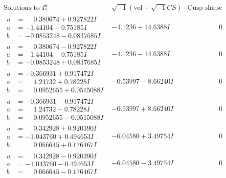 \documentclass[1p]{elsarticle_modified}
\theoremstyle{definition}
\newcommand{\I}{\sqrt{-1}}
\begin{document}
$$\begin{array}{c|c|c}  
\text{Solutions to }I^u_{1}& \I (\text{vol} + \sqrt{-1}CS) & \text{Cusp shape}\\
 \hline 
\begin{aligned}
u &= \phantom{-}0.380674 + 0.927822 I \\
a &= -1.44104 + 0.75185 I \\
b &= -0.0853248 - 0.0837685 I\end{aligned}
 & -4.1236 + 14.6388 I & \phantom{-0.000000 } 0 \\ \hline\begin{aligned}
u &= \phantom{-}0.380674 - 0.927822 I \\
a &= -1.44104 - 0.75185 I \\
b &= -0.0853248 + 0.0837685 I\end{aligned}
 & -4.1236 - 14.6388 I & \phantom{-0.000000 } 0 \\ \hline\begin{aligned}
u &= -0.366931 + 0.917472 I \\
a &= \phantom{-}1.24732 + 0.78228 I \\
b &= \phantom{-}0.0952655 + 0.0515088 I\end{aligned}
 & -0.53997 - 8.66240 I & \phantom{-0.000000 } 0 \\ \hline\begin{aligned}
u &= -0.366931 - 0.917472 I \\
a &= \phantom{-}1.24732 - 0.78228 I \\
b &= \phantom{-}0.0952655 - 0.0515088 I\end{aligned}
 & -0.53997 + 8.66240 I & \phantom{-0.000000 } 0 \\ \hline\begin{aligned}
u &= \phantom{-}0.342928 + 0.920390 I \\
a &= -1.043760 + 0.494653 I \\
b &= \phantom{-}0.066645 + 0.176467 I\end{aligned}
 & -6.04580 + 3.49754 I & \phantom{-0.000000 } 0 \\ \hline\begin{aligned}
u &= \phantom{-}0.342928 - 0.920390 I \\
a &= -1.043760 - 0.494653 I \\
b &= \phantom{-}0.066645 - 0.176467 I\end{aligned}
 & -6.04580 - 3.49754 I & \phantom{-0.000000 } 0 \\ \hline\begin{aligned}

\end{aligned}
\end{array}$$
\end{document}
